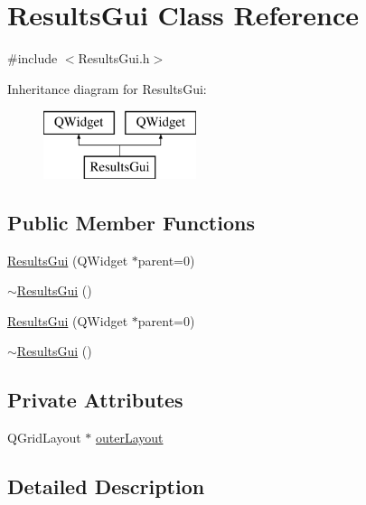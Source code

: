 \hypertarget{class_results_gui}{\section{Results\-Gui Class Reference}
\label{class_results_gui}
}


{\ttfamily \#include $<$Results\-Gui.\-h$>$}

Inheritance diagram for Results\-Gui\-:\begin{figure}[H]
\begin{center}
\leavevmode
\includegraphics[height=2.000000cm]{class_results_gui}
\end{center}
\end{figure}
\subsection*{Public Member Functions}
\begin{DoxyCompactItemize}
\item 
\hyperlink{class_results_gui_a0f8bbfce1477d6c9eb40552c66812a67}{Results\-Gui} (Q\-Widget $\ast$parent=0)
\item 
\hyperlink{class_results_gui_ac5527c1cb78aae767527c50a87183b3b}{$\sim$\-Results\-Gui} ()
\item 
\hyperlink{class_results_gui_a0f8bbfce1477d6c9eb40552c66812a67}{Results\-Gui} (Q\-Widget $\ast$parent=0)
\item 
\hyperlink{class_results_gui_ac5527c1cb78aae767527c50a87183b3b}{$\sim$\-Results\-Gui} ()
\end{DoxyCompactItemize}
\subsection*{Private Attributes}
\begin{DoxyCompactItemize}
\item 
Q\-Grid\-Layout $\ast$ \hyperlink{class_results_gui_a9e006fbee3028a92464f5379595703ef}{outer\-Layout}
\end{DoxyCompactItemize}


\subsection{Detailed Description}


